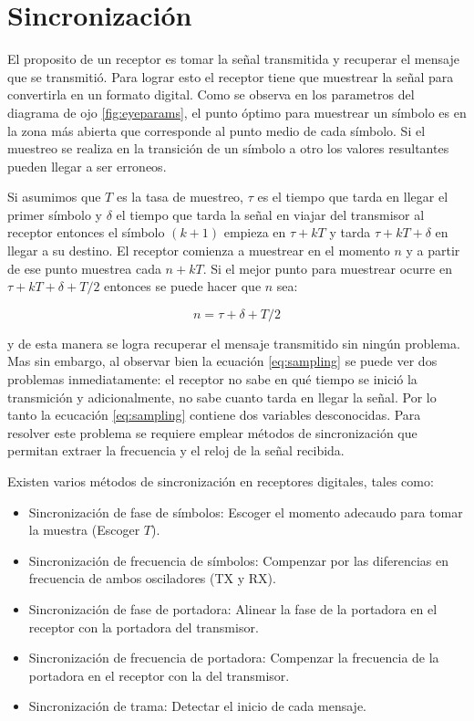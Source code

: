 \section{Sincronizaci\'on}
El proposito de un receptor es tomar la se\~nal transmitida y recuperar el mensaje que se transmiti\'o. Para lograr esto el
receptor tiene que muestrear la se\~nal para convertirla en un formato digital. Como se observa en los parametros del diagrama de
ojo \ref{fig:eyeparams}, el punto \'optimo para muestrear un s\'imbolo es en la zona m\'as abierta que corresponde al punto medio
de cada s\'imbolo. Si el muestreo se realiza en la transici\'on de un s\'imbolo a otro los valores resultantes pueden llegar a ser
erroneos.

Si asumimos que $T$ es la tasa de muestreo, $\tau$ es el tiempo que tarda en llegar el primer s\'imbolo y $\delta$ el tiempo que
tarda la se\~nal en viajar del transmisor al receptor entonces el s\'imbolo $(k+1)$ empieza en $\tau+kT$ y tarda $\tau+kT+\delta$
en llegar a su destino. El receptor comienza a muestrear en el momento $n$ y a partir de ese punto muestrea cada $n+kT$. Si el
mejor punto para muestrear ocurre en $\tau+kT+ \delta + T/2$ entonces se puede hacer que $n$ sea:

\begin{equation}\label{eq:sampling}
n=\tau+\delta+T/2
\end{equation}

y de esta manera se logra recuperar el mensaje transmitido sin ning\'un problema. Mas sin embargo, al observar bien la ecuaci\'on
\ref{eq:sampling} se puede ver dos problemas inmediatamente: el receptor no sabe en qu\'e tiempo se inici\'o la transmici\'on y
adicionalmente, no sabe cuanto tarda en llegar la se\~nal. Por lo tanto la ecucaci\'on \ref{eq:sampling} contiene dos
variables desconocidas. Para resolver este problema se requiere emplear m\'etodos de sincronizaci\'on que permitan extraer la
frecuencia y el reloj de la se\~nal recibida.

Existen varios m\'etodos de sincronizaci\'on en receptores digitales, tales como:

\begin{itemize}
  \item Sincronizaci\'on de fase de s\'imbolos: Escoger el momento adecaudo para tomar la muestra (Escoger $T$).
  \item Sincronizaci\'on de frecuencia de s\'imbolos: Compenzar por las diferencias en frecuencia de ambos osciladores (TX y RX).
  \item Sincronizaci\'on de fase de portadora: Alinear la fase de la portadora en el receptor con la portadora del transmisor.
  \item Sincronizaci\'on de frecuencia de portadora: Compenzar la frecuencia de la portadora en el receptor con la del
  transmisor.
  \item Sincronizaci\'on de trama: Detectar el inicio de cada mensaje.
\end{itemize}

